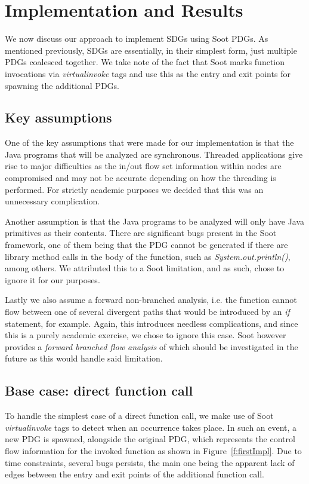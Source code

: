 \documentclass[authoryear,preprint]{sigplanconf}
\begin{document}
\section{Implementation and Results}

We now discuss our approach to implement SDGs using Soot PDGs. As mentioned previously, SDGs are essentially, in their simplest form, just multiple PDGs coalesced together. We take note of the fact that Soot marks function invocations via \textit{virtualinvoke} tags and use this as the entry and exit points for spawning the additional PDGs.

\subsection{Key assumptions}

One of the key assumptions that were made for our implementation is that the Java programs that will be analyzed are synchronous. Threaded applications give rise to major difficulties as the in/out flow set information within nodes are compromised and may not be accurate depending on how the threading is performed. For strictly academic purposes we decided that this was an unnecessary complication.

Another assumption is that the Java programs to be analyzed will only have Java primitives as their contents. There are significant bugs present in the Soot framework, one of them being that the PDG cannot be generated if there are library method calls in the body of the function, such as \textit{System.out.println()}, among others. We attributed this to a Soot limitation, and as such, chose to ignore it for our purposes.

Lastly we also assume a forward non-branched analysis, i.e. the function cannot flow between one of several divergent paths that would be introduced by an \textit{if} statement, for example. Again, this introduces needless complications, and since this is a purely academic exercise, we chose to ignore this case. Soot however provides a \textit{forward branched flow analysis} of which should be investigated in the future as this would handle said limitation.

\subsection{Base case: direct function call}

To handle the simplest case of a direct function call, we make use of Soot \textit{virtualinvoke} tags to detect when an occurrence takes place. In such an event, a new PDG is spawned, alongside the original PDG, which represents the control flow information for the invoked function as shown in Figure~\ref{f:firstImpl}. Due to time constraints, several bugs persists, the main one being the apparent lack of edges between the entry and exit points of the additional function call.
\end{document}
